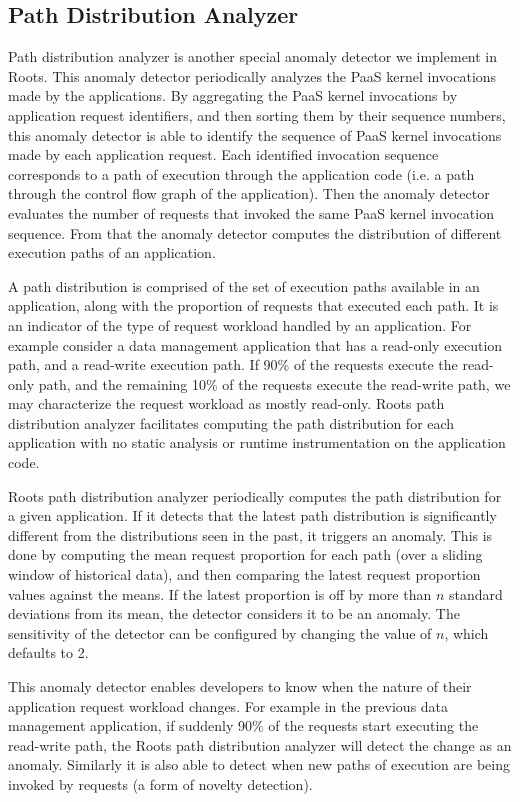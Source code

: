 \subsection{Path Distribution Analyzer}
Path distribution analyzer is another special anomaly detector we implement in Roots. This
anomaly detector periodically analyzes the PaaS kernel invocations made by the applications.
By aggregating the PaaS kernel invocations by application request identifiers, and then sorting them by
their sequence numbers, this anomaly detector is able to identify the sequence of
PaaS kernel invocations made by each application request. 
Each identified invocation sequence corresponds to a path of
execution through the application code (i.e. a path through the control flow graph of the application). 
Then the anomaly detector evaluates the number of requests
that invoked the same PaaS kernel invocation sequence. From that the anomaly detector
computes the distribution of different execution paths of an application.

A path distribution is comprised of the set of execution paths available in an application, along
with the proportion of requests that executed each path.
It is an indicator of the type of request workload handled by an application.
For example consider a data management application that has a read-only execution path, and a read-write 
execution path. If 90\% of the requests execute the read-only path, and the remaining 10\% of the requests
execute the read-write path, we may characterize the request workload as mostly read-only. 
Roots path distribution analyzer facilitates computing the path distribution for each application
with no static analysis or runtime instrumentation on the application code.

Roots path distribution analyzer periodically computes the path distribution for a given application.
If it detects that the latest path distribution is significantly different from the distributions seen in the 
past, it triggers an anomaly. This is done by computing the mean request proportion for each path
(over a sliding window of historical data),
and then comparing the latest request proportion values against the means. If the latest proportion
is off by more than $n$ standard deviations from its mean, the detector considers it to be an
anomaly. The sensitivity of the detector can be configured by changing the value of $n$, which
defaults to 2. 

This anomaly detector enables developers to know when the nature of their application request
workload changes. For example in the previous data management application, if suddenly 90\%
of the requests start executing the read-write path, the Roots path distribution analyzer will
detect the change as an anomaly. Similarly it is also able to detect when new paths of execution
are being invoked by requests (a form of novelty detection).

